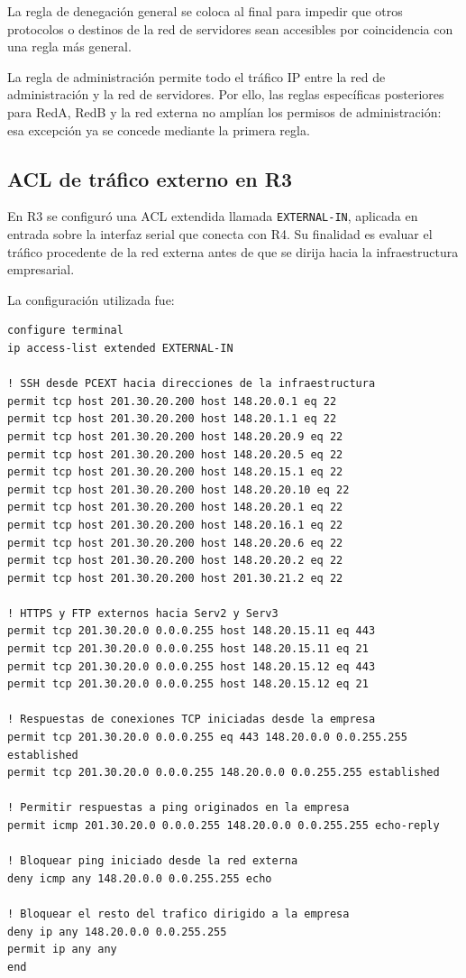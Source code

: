 \documentclass[12pt,a4paper]{article}
\begin{document}
La regla de denegación general se coloca al final para impedir
que otros protocolos o destinos de la red de servidores sean
accesibles por coincidencia con una regla más general.

La regla de administración permite todo el tráfico IP entre
la red de administración y la red de servidores. Por ello,
las reglas específicas posteriores para RedA, RedB y la red
externa no amplían los permisos de administración: esa excepción
ya se concede mediante la primera regla.

\subsection{ACL de tráfico externo en R3}

En R3 se configuró una ACL extendida llamada \texttt{EXTERNAL-IN},
aplicada en entrada sobre la interfaz serial que conecta con R4.
Su finalidad es evaluar el tráfico procedente de la red externa
antes de que se dirija hacia la infraestructura empresarial.

La configuración utilizada fue:

\begin{lstlisting}
configure terminal
ip access-list extended EXTERNAL-IN

! SSH desde PCEXT hacia direcciones de la infraestructura
permit tcp host 201.30.20.200 host 148.20.0.1 eq 22
permit tcp host 201.30.20.200 host 148.20.1.1 eq 22
permit tcp host 201.30.20.200 host 148.20.20.9 eq 22
permit tcp host 201.30.20.200 host 148.20.20.5 eq 22
permit tcp host 201.30.20.200 host 148.20.15.1 eq 22
permit tcp host 201.30.20.200 host 148.20.20.10 eq 22
permit tcp host 201.30.20.200 host 148.20.20.1 eq 22
permit tcp host 201.30.20.200 host 148.20.16.1 eq 22
permit tcp host 201.30.20.200 host 148.20.20.6 eq 22
permit tcp host 201.30.20.200 host 148.20.20.2 eq 22
permit tcp host 201.30.20.200 host 201.30.21.2 eq 22

! HTTPS y FTP externos hacia Serv2 y Serv3
permit tcp 201.30.20.0 0.0.0.255 host 148.20.15.11 eq 443
permit tcp 201.30.20.0 0.0.0.255 host 148.20.15.11 eq 21
permit tcp 201.30.20.0 0.0.0.255 host 148.20.15.12 eq 443
permit tcp 201.30.20.0 0.0.0.255 host 148.20.15.12 eq 21

! Respuestas de conexiones TCP iniciadas desde la empresa
permit tcp 201.30.20.0 0.0.0.255 eq 443 148.20.0.0 0.0.255.255 established
permit tcp 201.30.20.0 0.0.0.255 148.20.0.0 0.0.255.255 established

! Permitir respuestas a ping originados en la empresa
permit icmp 201.30.20.0 0.0.0.255 148.20.0.0 0.0.255.255 echo-reply

! Bloquear ping iniciado desde la red externa
deny icmp any 148.20.0.0 0.0.255.255 echo

! Bloquear el resto del trafico dirigido a la empresa
deny ip any 148.20.0.0 0.0.255.255
permit ip any any
end
\end{lstlisting}
\end{document}
